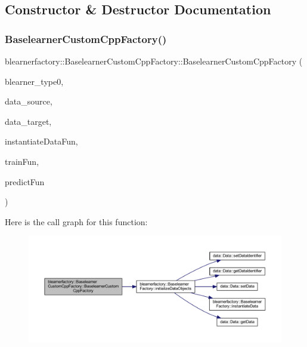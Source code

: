 \subsection{Constructor \& Destructor Documentation}
\mbox{\label{classblearnerfactory_1_1_baselearner_custom_cpp_factory_aede05893f296f7cc4fa07b0601a426e8}} 
\subsubsection{\texorpdfstring{Baselearner\+Custom\+Cpp\+Factory()}{BaselearnerCustomCppFactory()}}
{\footnotesize\ttfamily blearnerfactory\+::\+Baselearner\+Custom\+Cpp\+Factory\+::\+Baselearner\+Custom\+Cpp\+Factory (\begin{DoxyParamCaption}\item[{const std\+::string \&}]{blearner\+\_\+type0,  }\item[{\mbox{\hyperlink{classdata_1_1_data}{data\+::\+Data}} $\ast$}]{data\+\_\+source,  }\item[{\mbox{\hyperlink{classdata_1_1_data}{data\+::\+Data}} $\ast$}]{data\+\_\+target,  }\item[{S\+E\+XP}]{instantiate\+Data\+Fun,  }\item[{S\+E\+XP}]{train\+Fun,  }\item[{S\+E\+XP}]{predict\+Fun }\end{DoxyParamCaption})}

Here is the call graph for this function\+:
\nopagebreak
\begin{figure}[H]
\begin{center}
\leavevmode
\includegraphics[width=350pt]{classblearnerfactory_1_1_baselearner_custom_cpp_factory_aede05893f296f7cc4fa07b0601a426e8_cgraph}
\end{center}
\end{figure}



